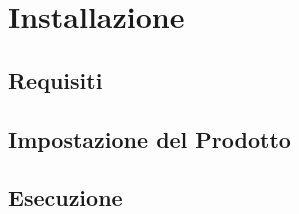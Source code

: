 \section{Installazione}\label{Installazione}

\subsection{Requisiti}\label{Requisiti}


\subsection{Impostazione del Prodotto}\label{Setup}

\subsection{Esecuzione}\label{run}